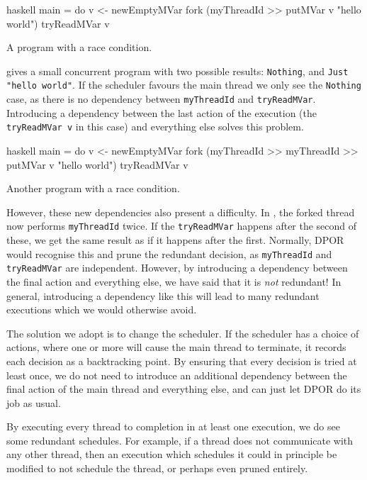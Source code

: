 \begin{listing}
\centering
\begin{cminted}{haskell}
main = do
  v <- newEmptyMVar
  fork (myThreadId >> putMVar v "hello world")
  tryReadMVar v
\end{cminted}
\caption{A program with a race condition.}\label{lst:daemon1}
\end{listing}

 gives a small concurrent program with two possible
results: \verb|Nothing|, and \verb|Just "hello world"|.  If the
scheduler favours the main thread we only see the \verb|Nothing| case,
as there is no dependency between \verb|myThreadId| and
\verb|tryReadMVar|.  Introducing a dependency between the last action
of the execution (the \verb|tryReadMVar v| in this case) and
everything else solves this problem.

\begin{listing}
\centering
\begin{cminted}{haskell}
main = do
  v <- newEmptyMVar
  fork (myThreadId >> myThreadId >> putMVar v "hello world")
  tryReadMVar v
\end{cminted}
\caption{Another program with a race condition.}\label{lst:daemon2}
\end{listing}

However, these new dependencies also present a difficulty.  In
, the forked thread now performs \verb|myThreadId|
twice.  If the \verb|tryReadMVar| happens after the second of these,
we get the same result as if it happens after the first.  Normally,
DPOR would recognise this and prune the redundant decision, as
\verb|myThreadId| and \verb|tryReadMVar| are independent.  However, by
introducing a dependency between the final action and everything else,
we have said that it is \emph{not} redundant!  In general, introducing
a dependency like this will lead to many redundant executions which we
would otherwise avoid.

The solution we adopt is to change the scheduler.  If the scheduler
has a choice of actions, where one or more will cause the main thread
to terminate, it records each decision as a backtracking point.  By
ensuring that every decision is tried at least once, we do not need to
introduce an additional dependency between the final action of the
main thread and everything else, and can just let DPOR do its job as
usual.

By executing every thread to completion in at least one execution, we
do see some redundant schedules.  For example, if a thread does not
communicate with any other thread, then an execution which schedules
it could in principle be modified to not schedule the thread, or
perhaps even pruned entirely.

